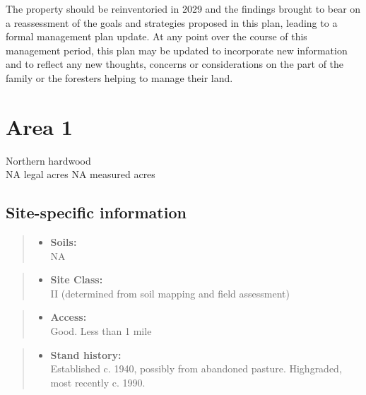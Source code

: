 \documentclass[]{tufte-handout}
\providecommand{\tightlist}{%
  \setlength{\itemsep}{0pt}\setlength{\parskip}{0pt}}
\begin{document}
The property should be reinventoried in 2029 and the findings brought to
bear on a reassessment of the goals and strategies proposed in this
plan, leading to a formal management plan update. At any point over the
course of this management period, this plan may be updated to
incorporate new information and to reflect any new thoughts, concerns or
considerations on the part of the family or the foresters helping to
manage their land.

\newpage

\section{Area 1}\label{area-1}

Northern hardwood\\
\noindent NA legal acres \textbar{} NA measured acres

\subsection{Site-specific information}\label{site-specific-information}

\begin{quote}
\begin{itemize}
\tightlist
\item
  \textbf{Soils:}\\
  \indent\indent  NA
\end{itemize}
\end{quote}

\begin{quote}
\begin{itemize}
\tightlist
\item
  \textbf{Site Class:}\\
  \vspace{2pt} II (determined from soil mapping and field assessment)
\end{itemize}
\end{quote}

\begin{quote}
\begin{itemize}
\tightlist
\item
  \textbf{Access:}\\
  \vspace{2pt} Good. Less than 1 mile
\end{itemize}
\end{quote}

\begin{quote}
\begin{itemize}
\tightlist
\item
  \textbf{Stand history:}\\
  \vspace{2pt} Established c. 1940, possibly from abandoned pasture.
  Highgraded, most recently c. 1990.
\end{itemize}
\end{quote}
\end{document}
